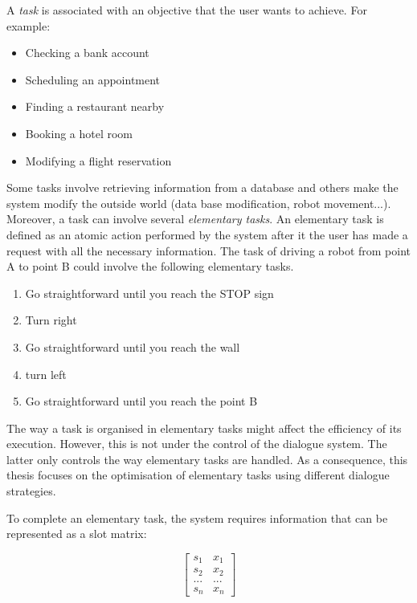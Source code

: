 	A \textit{task} is associated with an objective that the user wants to achieve. For example:
	
	\begin{itemize}
		\item Checking a bank account
		\item Scheduling an appointment
		\item Finding a restaurant nearby
		\item Booking a hotel room
		\item Modifying a flight reservation
	\end{itemize}
	
	Some tasks involve retrieving information from a database and others make the system modify the outside world (data base modification, robot movement...). Moreover, a task can involve several \textit{elementary tasks}. An elementary task is defined as an atomic action performed by the system after it the user has made a request with all the necessary information. The task of driving a robot from point A to point B could involve the following elementary tasks.
	
	\begin{enumerate}
		\item Go straightforward until you reach the STOP sign
		\item Turn right
		\item Go straightforward until you reach the wall
		\item turn left
		\item Go straightforward until you reach the point B
	\end{enumerate}
	
	The way a task is organised in elementary tasks might affect the efficiency of its execution. However, this is not under the control of the dialogue system. The latter only controls the way elementary tasks are handled. As a consequence, this thesis focuses on the optimisation of elementary tasks using different dialogue strategies.
	
	To complete an elementary task, the system requires information that can be represented as a slot matrix:
	
		$$
		\begin{bmatrix}
			s_1 & x_1 \\
			s_2 & x_2 \\
			... & ... \\
			s_n & x_n
		\end{bmatrix}
		$$
	
